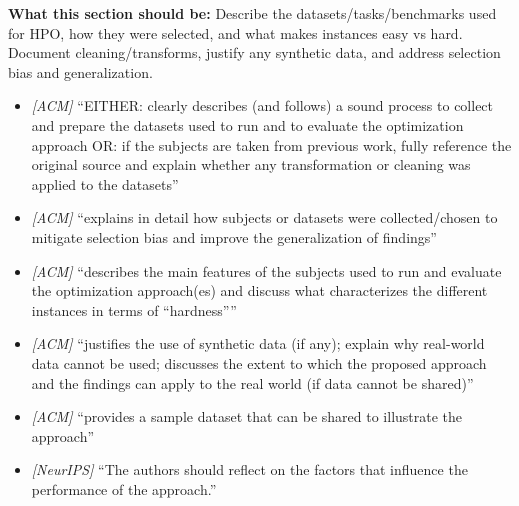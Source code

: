 \noindent\textbf{What this section should be:}
Describe the datasets/tasks/benchmarks used for HPO, how they were selected, and what makes instances easy vs hard. Document cleaning/transforms, justify any synthetic data, and address selection bias and generalization.
\begin{itemize}
  \item \textit{[ACM]} ``EITHER: clearly describes (and follows) a sound process to collect and prepare the datasets used to run and to evaluate the optimization approach OR: if the subjects are taken from previous work, fully reference the original source and explain whether any transformation or cleaning was applied to the datasets''
  \item \textit{[ACM]} ``explains in detail how subjects or datasets were collected/chosen to mitigate selection bias and improve the generalization of findings''
  \item \textit{[ACM]} ``describes the main features of the subjects used to run and evaluate the optimization approach(es) and discuss what characterizes the different instances in terms of ``hardness''''
  \item \textit{[ACM]} ``justifies the use of synthetic data (if any); explain why real-world data cannot be used; discusses the extent to which the proposed approach and the findings can apply to the real world (if data cannot be shared)''
  \item \textit{[ACM]} ``provides a sample dataset that can be shared to illustrate the approach''
  \item \textit{[NeurIPS]} ``The authors should reflect on the factors that influence the performance of the approach.''
\end{itemize}